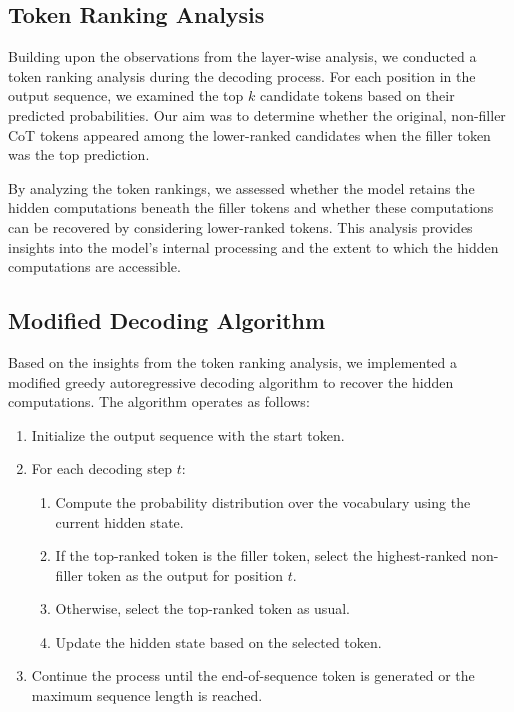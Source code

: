 \documentclass{article}
\begin{document}
\subsection{Token Ranking Analysis}

Building upon the observations from the layer-wise analysis, we conducted a token ranking analysis during the decoding process. For each position in the output sequence, we examined the top $k$ candidate tokens based on their predicted probabilities. Our aim was to determine whether the original, non-filler CoT tokens appeared among the lower-ranked candidates when the filler token was the top prediction.

By analyzing the token rankings, we assessed whether the model retains the hidden computations beneath the filler tokens and whether these computations can be recovered by considering lower-ranked tokens. This analysis provides insights into the model's internal processing and the extent to which the hidden computations are accessible.

\subsection{Modified Decoding Algorithm}
\label{ssec:Filler tokens}

Based on the insights from the token ranking analysis, we implemented a modified greedy autoregressive decoding algorithm to recover the hidden computations. The algorithm operates as follows:

\begin{enumerate}
    \item Initialize the output sequence with the start token.
    \item For each decoding step $t$:
    \begin{enumerate}
        \item Compute the probability distribution over the vocabulary using the current hidden state.
        \item If the top-ranked token is the filler token, select the highest-ranked non-filler token as the output for position $t$.
        \item Otherwise, select the top-ranked token as usual.
        \item Update the hidden state based on the selected token.
    \end{enumerate}
    \item Continue the process until the end-of-sequence token is generated or the maximum sequence length is reached.
\end{enumerate}
\end{document}
